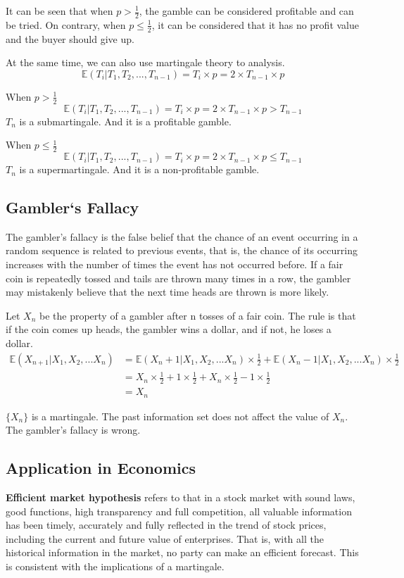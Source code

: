 \documentclass[11pt]{article} %
\begin{document}
It can be seen that when $p>\frac{1}{2}$, the gamble can be considered profitable and can be tried. On contrary, when $p\leq \frac{1}{2}$, it can be considered that it has no profit value and the buyer should give up.

At the same time, we can also use martingale theory to analysis.
$$
\mathbb E(T_i|T_1,T_2,...,T_{n-1}) = T_i \times p = 2\times T_{n-1} \times p
$$

When $p > \frac{1}{2}$
$$
\mathbb E(T_i|T_1,T_2,...,T_{n-1}) = T_i \times p = 2\times T_{n-1} \times p > T_{n-1}
$$
$T_n$ is a submartingale. And it is a profitable gamble.

When $p \leq \frac{1}{2}$
$$
\mathbb E(T_i|T_1,T_2,...,T_{n-1}) = T_i \times p = 2\times T_{n-1} \times p \leq T_{n-1}
$$
$T_n$ is a supermartingale. And it is a non-profitable gamble.
\subsection{Gambler‘s Fallacy}

The gambler's fallacy is the false belief that the chance of an event occurring in a random sequence is related to previous events, that is, the chance of its occurring increases with the number of times the event has not occurred before. \cite{lable2}If a fair coin is repeatedly tossed and tails are thrown many times in a row, the gambler may mistakenly believe that the next time heads are thrown is more likely.

Let $X_n$ be the property of a gambler after n tosses of a fair coin. The rule is that if the coin comes up heads, the gambler wins a dollar, and if not, he loses a dollar.
$$
\begin{aligned}
\mathbb E(X_{n+1}|X_1,X_2,...X_n) &= \mathbb E(X_n + 1|X_1,X_2,...X_n) \times \frac{1}{2} + \mathbb E(X_n-1|X_1,X_2,...X_n) \times \frac{1}{2} \\
&= X_n\times \frac{1}{2} + 1 \times \frac{1}{2} + X_n\times \frac{1}{2} - 1 \times \frac{1}{2}\\
&= X_n
\end{aligned}
$$

$\{X_n\}$ is a martingale. The past information set does not affect the value of $X_n$. The gambler's fallacy is wrong.

\subsection{Application in Economics}

\textbf{Efficient market hypothesis}\cite{lable3} refers to that in a stock market with sound laws, good functions, high transparency and full competition, all valuable information has been timely, accurately and fully reflected in the trend of stock prices, including the current and future value of enterprises. That is, with all the historical information in the market, no party can make an efficient forecast. This is consistent with the implications of a martingale.
\end{document}
